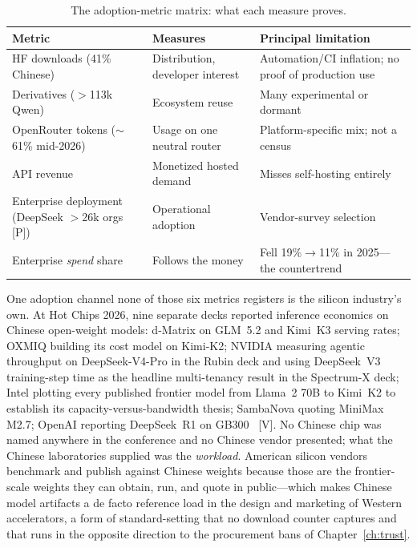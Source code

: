 \begin{table}[htbp]
  \centering
  \small
  \caption{The adoption-metric matrix: what each measure proves.}
  \label{tab:metric-matrix}
  \begin{tabular}{p{38mm}p{50mm}p{54mm}}
    \toprule
    Metric & Measures & Principal limitation \\
    \midrule
    HF downloads (41\% Chinese) & Distribution, developer interest & Automation/CI inflation; no proof of production use~\cite{hf-spring-2026} \\
    Derivatives ($>$113k Qwen) & Ecosystem reuse & Many experimental or dormant \\
    OpenRouter tokens ($\sim$61\% mid-2026) & Usage on one neutral router & Platform-specific mix; not a census~\cite{openrouter-2026} \\
    API revenue & Monetized hosted demand & Misses self-hosting entirely \\
    Enterprise deployment (DeepSeek $>$26k orgs [P]) & Operational adoption & Vendor-survey selection~\cite{sos-ai} \\
    Enterprise \emph{spend} share & Follows the money & Fell 19\%$\rightarrow$11\% in 2025---the countertrend~\cite{menlo} \\
    \bottomrule
  \end{tabular}
\end{table}

One adoption channel none of those six metrics registers is the silicon industry's own. At Hot Chips 2026, nine separate decks reported inference economics on Chinese open-weight models: d-Matrix on GLM~5.2 and Kimi~K3 serving rates; OXMIQ building its cost model on Kimi-K2; NVIDIA measuring agentic throughput on DeepSeek-V4-Pro in the Rubin deck and using DeepSeek~V3 training-step time as the headline multi-tenancy result in the Spectrum-X deck; Intel plotting every published frontier model from Llama~2 70B to Kimi~K2 to establish its capacity-versus-bandwidth thesis; SambaNova quoting MiniMax M2.7; OpenAI reporting DeepSeek~R1 on GB300~\cite{hc2026-china-bench} [V]. No Chinese chip was named anywhere in the conference and no Chinese vendor presented; what the Chinese laboratories supplied was the \emph{workload}. American silicon vendors benchmark and publish against Chinese weights because those are the frontier-scale weights they can obtain, run, and quote in public---which makes Chinese model artifacts a de facto reference load in the design and marketing of Western accelerators, a form of standard-setting that no download counter captures and that runs in the opposite direction to the procurement bans of Chapter~\ref{ch:trust}.

